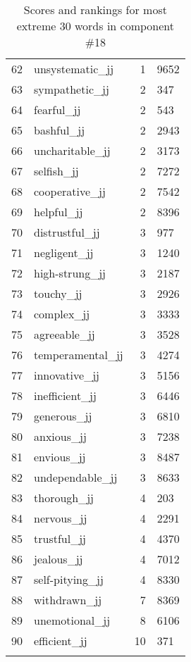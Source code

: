 \begin{longtable}[!htbp]{| rlr@{.}l |}
    62 & unsystematic\_jj & 1 & 9652 \\
    63 & sympathetic\_jj & 2 & 347 \\
    64 & fearful\_jj & 2 & 543 \\
    65 & bashful\_jj & 2 & 2943 \\
    66 & uncharitable\_jj & 2 & 3173 \\
    67 & selfish\_jj & 2 & 7272 \\
    68 & cooperative\_jj & 2 & 7542 \\
    69 & helpful\_jj & 2 & 8396 \\
    70 & distrustful\_jj & 3 & 977 \\
    71 & negligent\_jj & 3 & 1240 \\
    72 & high-strung\_jj & 3 & 2187 \\
    73 & touchy\_jj & 3 & 2926 \\
    74 & complex\_jj & 3 & 3333 \\
    75 & agreeable\_jj & 3 & 3528 \\
    76 & temperamental\_jj & 3 & 4274 \\
    77 & innovative\_jj & 3 & 5156 \\
    78 & inefficient\_jj & 3 & 6446 \\
    79 & generous\_jj & 3 & 6810 \\
    80 & anxious\_jj & 3 & 7238 \\
    81 & envious\_jj & 3 & 8487 \\
    82 & undependable\_jj & 3 & 8633 \\
    83 & thorough\_jj & 4 & 203 \\
    84 & nervous\_jj & 4 & 2291 \\
    85 & trustful\_jj & 4 & 4370 \\
    86 & jealous\_jj & 4 & 7012 \\
    87 & self-pitying\_jj & 4 & 8330 \\
    88 & withdrawn\_jj & 7 & 8369 \\
    89 & unemotional\_jj & 8 & 6106 \\
    90 & efficient\_jj & 10 & 371 \\
    \hline
    \caption{Scores and rankings for most extreme 30 words in component \#18} \\
\end{longtable}

